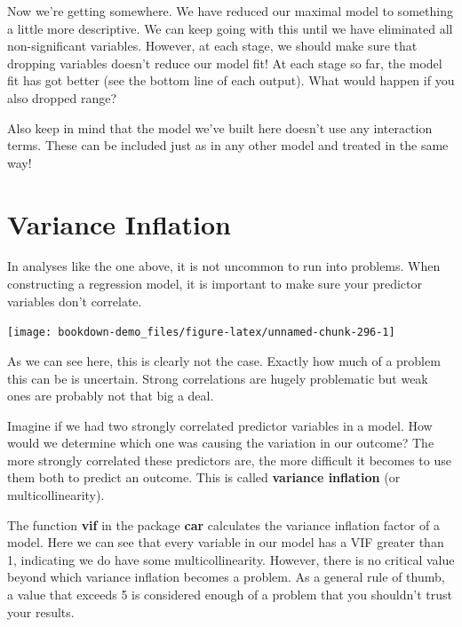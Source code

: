 \documentclass[
]{book}
\begin{document}
Now we're getting somewhere. We have reduced our maximal model to something a little more descriptive. We can keep going with this until we have eliminated all non-significant variables. However, at each stage, we should make sure that dropping variables doesn't reduce our model fit! At each stage so far, the model fit has got better (see the bottom line of each output). What would happen if you also dropped range?

Also keep in mind that the model we've built here doesn't use any interaction terms. These can be included just as in any other model and treated in the same way!

\hypertarget{variance-inflation}{%
\section{Variance Inflation}\label{variance-inflation}}

In analyses like the one above, it is not uncommon to run into problems. When constructing a regression model, it is important to make sure your predictor variables don't correlate.

\begin{center}\texttt{[image: bookdown-demo\_files/figure-latex/unnamed-chunk-296-1]} \end{center}

As we can see here, this is clearly not the case. Exactly how much of a problem this can be is uncertain. Strong correlations are hugely problematic but weak ones are probably not that big a deal.

Imagine if we had two strongly correlated predictor variables in a model. How would we determine which one was causing the variation in our outcome? The more strongly correlated these predictors are, the more difficult it becomes to use them both to predict an outcome. This is called \textbf{variance inflation} (or multicollinearity).

The function \textbf{vif} in the package \textbf{car} \citep{car} calculates the variance inflation factor of a model. Here we can see that every variable in our model has a VIF greater than 1, indicating we do have some multicollinearity. However, there is no critical value beyond which variance inflation becomes a problem. As a general rule of thumb, a value that exceeds 5 is considered enough of a problem that you shouldn't trust your results.
\end{document}
